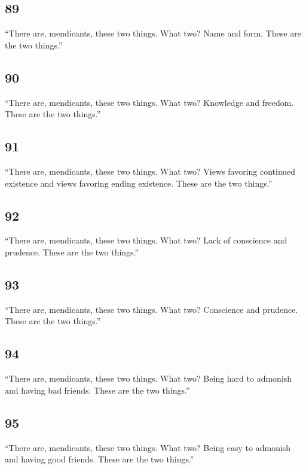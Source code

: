 \documentclass[12pt,openany]{book}%
\begin{document}
\subsection*{89 }

“There are, mendicants, these two things. What two? Name and form. These are the two things.” 

\subsection*{90 }

“There are, mendicants, these two things. What two? Knowledge and freedom. These are the two things.” 

\subsection*{91 }

“There are, mendicants, these two things. What two? Views favoring continued existence and views favoring ending existence. These are the two things.” 

\subsection*{92 }

“There are, mendicants, these two things. What two? Lack of conscience and prudence. These are the two things.” 

\subsection*{93 }

“There are, mendicants, these two things. What two? Conscience and prudence. These are the two things.” 

\subsection*{94 }

“There are, mendicants, these two things. What two? Being hard to admonish and having bad friends. These are the two things.” 

\subsection*{95 }

“There are, mendicants, these two things. What two? Being easy to admonish and having good friends. These are the two things.” 
\end{document}
